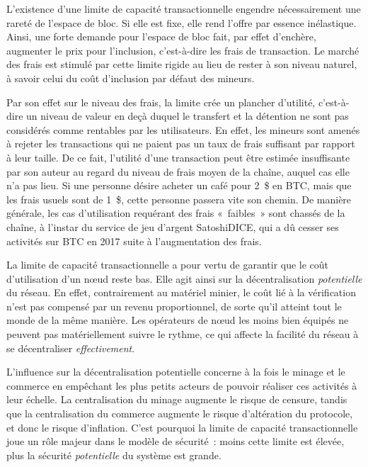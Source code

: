 L'existence d'une limite de capacité transactionnelle engendre nécessairement une rareté de l'espace de bloc. Si elle est fixe, elle rend l'offre par essence inélastique. Ainsi, une forte demande pour l'espace de bloc fait, par effet d'enchère, augmenter le prix pour l'inclusion, c'est-à-dire les frais de transaction. Le marché des frais est stimulé par cette limite rigide au lieu de rester à son niveau naturel, à savoir celui du coût d'inclusion par défaut des mineurs.

Par son effet sur le niveau des frais, la limite crée un plancher d'utilité, c'est-à-dire un niveau de valeur en deçà duquel le transfert et la détention ne sont pas considérés comme rentables par les utilisateurs. En effet, les mineurs sont amenés à rejeter les transactions qui ne paient pas un taux de frais suffisant par rapport à leur taille. De ce fait, l'utilité d'une transaction peut être estimée insuffisante par son auteur au regard du niveau de frais moyen de la chaîne, auquel cas elle n'a pas lieu. Si une personne désire acheter un café pour 2~\$ en BTC, mais que les frais usuels sont de 1~\$, cette personne passera vite son chemin. De manière générale, les cas d'utilisation requérant des frais «~faibles~» sont chassés de la chaîne, à l'instar du service de jeu d'argent SatoshiDICE, qui a dû cesser ses activités sur BTC en 2017 suite à l'augmentation des frais.

La limite de capacité transactionnelle a pour vertu de garantir que le coût d'utilisation d'un nœud reste bas. Elle agit ainsi sur la décentralisation \emph{potentielle} du réseau. En effet, contrairement au matériel minier, le coût lié à la vérification n'est pas compensé par un revenu proportionnel, de sorte qu'il atteint tout le monde de la même manière. Les opérateurs de nœud les moins bien équipés ne peuvent pas matériellement suivre le rythme, ce qui affecte la facilité du réseau à se décentraliser \emph{effectivement}. %

L'influence sur la décentralisation potentielle concerne à la fois le minage et le commerce en empêchant les plus petits acteurs de pouvoir réaliser ces activités à leur échelle. La centralisation du minage augmente le risque de censure, tandis que la centralisation du commerce augmente le risque d'altération du protocole, et donc le risque d'inflation. C'est pourquoi la limite de capacité transactionnelle joue un rôle majeur dans le modèle de sécurité~: moins cette limite est élevée, plus la sécurité \emph{potentielle} du système est grande.

